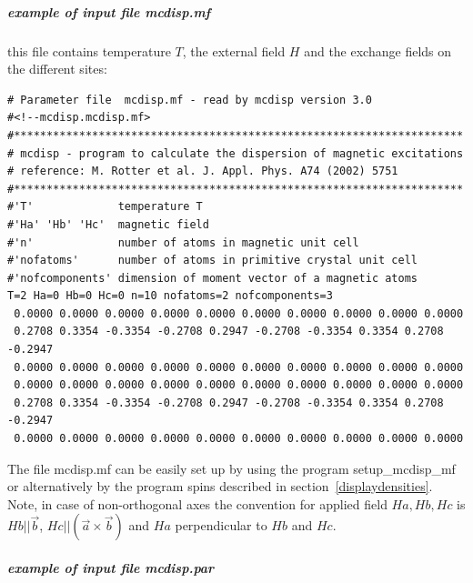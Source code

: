 \subparagraph{example of input file {\prg  mcdisp.mf}}
this file contains temperature $T$, the external field $H$ and
the exchange fields on the different sites:

\begin{verbatim}
# Parameter file  mcdisp.mf - read by mcdisp version 3.0
#<!--mcdisp.mcdisp.mf>
#*********************************************************************
# mcdisp - program to calculate the dispersion of magnetic excitations
# reference: M. Rotter et al. J. Appl. Phys. A74 (2002) 5751
#*********************************************************************
#'T'             temperature T
#'Ha' 'Hb' 'Hc'  magnetic field
#'n'             number of atoms in magnetic unit cell
#'nofatoms'      number of atoms in primitive crystal unit cell
#'nofcomponents' dimension of moment vector of a magnetic atoms
T=2 Ha=0 Hb=0 Hc=0 n=10 nofatoms=2 nofcomponents=3
 0.0000 0.0000 0.0000 0.0000 0.0000 0.0000 0.0000 0.0000 0.0000 0.0000
 0.2708 0.3354 -0.3354 -0.2708 0.2947 -0.2708 -0.3354 0.3354 0.2708 -0.2947
 0.0000 0.0000 0.0000 0.0000 0.0000 0.0000 0.0000 0.0000 0.0000 0.0000
 0.0000 0.0000 0.0000 0.0000 0.0000 0.0000 0.0000 0.0000 0.0000 0.0000
 0.2708 0.3354 -0.3354 -0.2708 0.2947 -0.2708 -0.3354 0.3354 0.2708 -0.2947
 0.0000 0.0000 0.0000 0.0000 0.0000 0.0000 0.0000 0.0000 0.0000 0.0000
\end{verbatim}

The file {\prg mcdisp.mf} can be easily set up by using the program {\prg %
setup\_mcdisp\_mf} or alternatively by the program {\prg spins} 
described in section~\ref{displaydensities}.
                            Note, in case of non-orthogonal axes the convention for applied field $Ha, Hb,Hc$                     
                            is $Hb||\vec b$, $Hc||(\vec a \times \vec b)$ and $Ha$ perpendicular to $Hb$ and $Hc$.

\subparagraph{example of input file {\prg mcdisp.par}}

